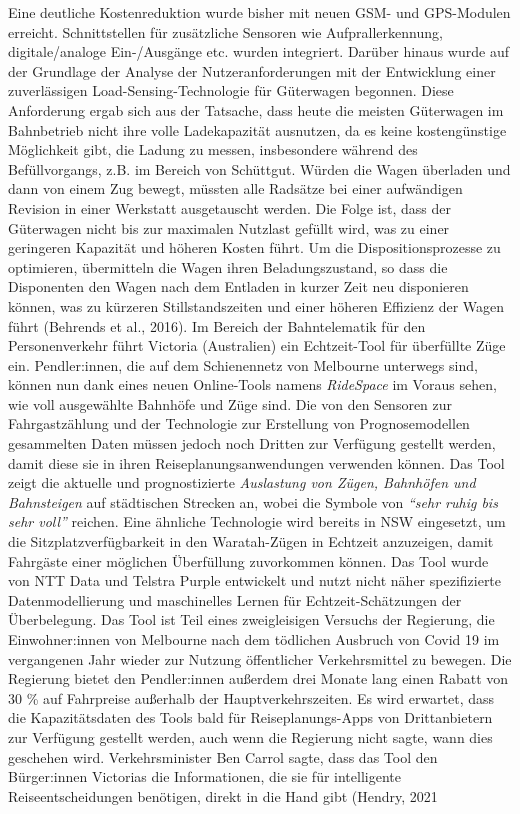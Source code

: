 \documentclass[
]{book}
\begin{document}
Eine deutliche Kostenreduktion wurde bisher mit neuen GSM- und GPS-Modulen erreicht. Schnittstellen für zusätzliche Sensoren wie Aufprallerkennung, digitale/analoge Ein-/Ausgänge etc. wurden integriert. Darüber hinaus wurde auf der Grundlage der Analyse der Nutzeranforderungen mit der Entwicklung einer zuverlässigen Load-Sensing-Technologie für Güterwagen begonnen. Diese Anforderung ergab sich aus der Tatsache, dass heute die meisten Güterwagen im Bahnbetrieb nicht ihre volle Ladekapazität ausnutzen, da es keine kostengünstige Möglichkeit gibt, die Ladung zu messen, insbesondere während des Befüllvorgangs, z.B. im Bereich von Schüttgut. Würden die Wagen überladen und dann von einem Zug bewegt, müssten alle Radsätze bei einer aufwändigen Revision in einer Werkstatt ausgetauscht werden. Die Folge ist, dass der Güterwagen nicht bis zur maximalen Nutzlast gefüllt wird, was zu einer geringeren Kapazität und höheren Kosten führt. Um die Dispositionsprozesse zu optimieren, übermitteln die Wagen ihren Beladungszustand, so dass die Disponenten den Wagen nach dem Entladen in kurzer Zeit neu disponieren können, was zu kürzeren Stillstandszeiten und einer höheren Effizienz der Wagen führt (Behrends et al., 2016).
Im Bereich der Bahntelematik für den Personenverkehr führt Victoria (Australien) ein Echtzeit-Tool für überfüllte Züge ein. Pendler:innen, die auf dem Schienennetz von Melbourne unterwegs sind, können nun dank eines neuen Online-Tools namens \emph{RideSpace} im Voraus sehen, wie voll ausgewählte Bahnhöfe und Züge sind. Die von den Sensoren zur Fahrgastzählung und der Technologie zur Erstellung von Prognosemodellen gesammelten Daten müssen jedoch noch Dritten zur Verfügung gestellt werden, damit diese sie in ihren Reiseplanungsanwendungen verwenden können. Das Tool zeigt die aktuelle und prognostizierte \emph{Auslastung von Zügen, Bahnhöfen und Bahnsteigen} auf städtischen Strecken an, wobei die Symbole von \emph{``sehr ruhig bis sehr voll''} reichen. Eine ähnliche Technologie wird bereits in NSW eingesetzt, um die Sitzplatzverfügbarkeit in den Waratah-Zügen in Echtzeit anzuzeigen, damit Fahrgäste einer möglichen Überfüllung zuvorkommen können. Das Tool wurde von NTT Data und Telstra Purple entwickelt und nutzt nicht näher spezifizierte Datenmodellierung und maschinelles Lernen für Echtzeit-Schätzungen der Überbelegung. Das Tool ist Teil eines zweigleisigen Versuchs der Regierung, die Einwohner:innen von Melbourne nach dem tödlichen Ausbruch von Covid 19 im vergangenen Jahr wieder zur Nutzung öffentlicher Verkehrsmittel zu bewegen. Die Regierung bietet den Pendler:innen außerdem drei Monate lang einen Rabatt von 30 \% auf Fahrpreise außerhalb der Hauptverkehrszeiten. Es wird erwartet, dass die Kapazitätsdaten des Tools bald für Reiseplanungs-Apps von Drittanbietern zur Verfügung gestellt werden, auch wenn die Regierung nicht sagte, wann dies geschehen wird. Verkehrsminister Ben Carrol sagte, dass das Tool den Bürger:innen Victorias die Informationen, die sie für intelligente Reiseentscheidungen benötigen, direkt in die Hand gibt (Hendry, 2021
\end{document}
